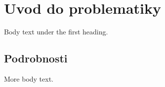 \documentclass[11pt,a4paper]{article}
\begin{document}
\section{Uvod do problematiky}

Body text under the first heading.

\subsection{Podrobnosti}

More body text.
\end{document}
